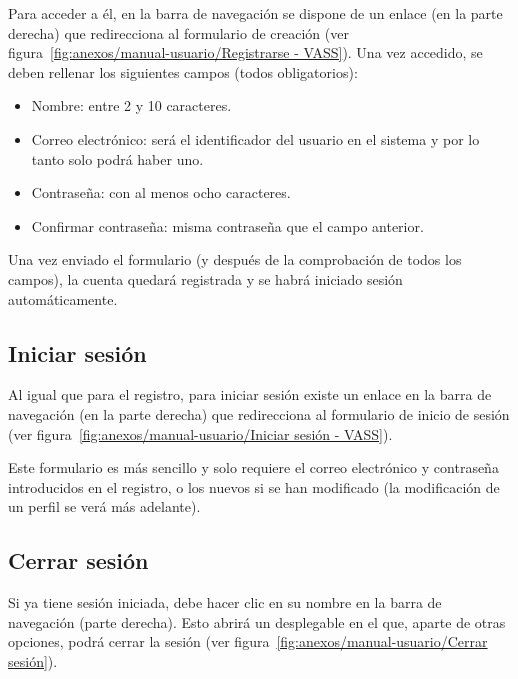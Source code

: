 Para acceder a él, en la barra de navegación se dispone de un enlace (en la
parte derecha) que redirecciona al formulario de creación (ver
figura~\ref{fig:anexos/manual-usuario/Registrarse - VASS}). Una vez accedido, se
deben rellenar los siguientes campos (todos obligatorios):
\begin{itemize}
    \item Nombre: entre 2 y 10 caracteres.
    \item Correo electrónico: será el identificador del usuario en el sistema y
    por lo tanto solo podrá haber uno.
    \item Contraseña: con al menos ocho caracteres.
    \item Confirmar contraseña: misma contraseña que el campo anterior.
\end{itemize}


Una vez enviado el formulario (y después de la comprobación de todos los
campos), la cuenta quedará registrada y se habrá iniciado sesión
automáticamente.

\subsection{Iniciar sesión}

Al igual que para el registro, para iniciar sesión existe un enlace en la barra
de navegación (en la parte derecha) que redirecciona al formulario de inicio de
sesión (ver
figura~\ref{fig:anexos/manual-usuario/Iniciar sesión - VASS}).


Este formulario es más sencillo y solo requiere el correo electrónico y
contraseña introducidos en el registro, o los nuevos si se han modificado (la
modificación de un perfil se verá más adelante).

\subsection{Cerrar sesión}

Si ya tiene sesión iniciada, debe hacer clic en su nombre en la barra de
navegación (parte derecha). Esto abrirá un desplegable en el que, aparte de
otras opciones, podrá cerrar la sesión (ver
figura~\ref{fig:anexos/manual-usuario/Cerrar sesión}).


